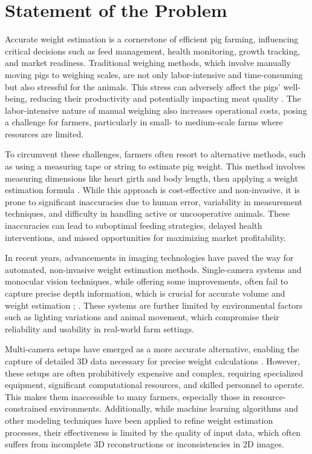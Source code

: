 {\section{Statement of the Problem}

Accurate weight estimation is a cornerstone of efficient pig farming, influencing critical decisions such as feed management, health monitoring, growth tracking, and market readiness. Traditional weighing methods, which involve manually moving pigs to weighing scales, are not only labor-intensive and time-consuming but also stressful for the animals. This stress can adversely affect the pigs’ well-being, reducing their productivity and potentially impacting meat quality \citep{li2014estimation}. The labor-intensive nature of manual weighing also increases operational costs, posing a challenge for farmers, particularly in small- to medium-scale farms where resources are limited.

To circumvent these challenges, farmers often resort to alternative methods, such as using a measuring tape or string to estimate pig weight. This method involves measuring dimensions like heart girth and body length, then applying a weight estimation formula \citep{ThePigSite}. While this approach is cost-effective and non-invasive, it is prone to significant inaccuracies due to human error, variability in measurement techniques, and difficulty in handling active or uncooperative animals. These inaccuracies can lead to suboptimal feeding strategies, delayed health interventions, and missed opportunities for maximizing market profitability.

In recent years, advancements in imaging technologies have paved the way for automated, non-invasive weight estimation methods. Single-camera systems and monocular vision techniques, while offering some improvements, often fail to capture precise depth information, which is crucial for accurate volume and weight estimation \citep{pezzuolo2018barn}; \citep{kollis2007weight}. These systems are further limited by environmental factors such as lighting variations and animal movement, which compromise their reliability and usability in real-world farm settings.

Multi-camera setups have emerged as a more accurate alternative, enabling the capture of detailed 3D data necessary for precise weight calculations \citep{dohmen2022computer}. However, these setups are often prohibitively expensive and complex, requiring specialized equipment, significant computational resources, and skilled personnel to operate. This makes them inaccessible to many farmers, especially those in resource-constrained environments. Additionally, while machine learning algorithms and other modeling techniques have been applied to refine weight estimation processes, their effectiveness is limited by the quality of input data, which often suffers from incomplete 3D reconstructions or inconsistencies in 2D images.

}
